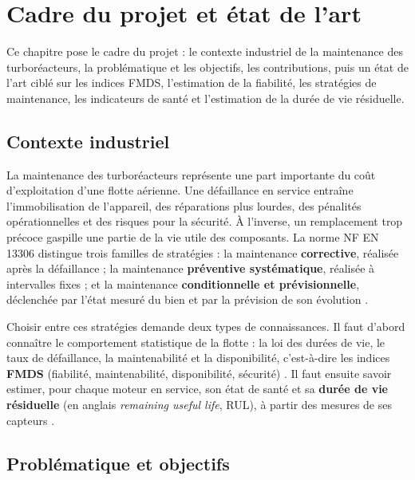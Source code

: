 \chapter{Cadre du projet et état de l'art}\label{sec:etat-art}

\chapintro

Ce chapitre pose le cadre du projet : le contexte industriel de la maintenance des turboréacteurs, la problématique et les objectifs, les contributions, puis un état de l'art ciblé sur les indices FMDS, l'estimation de la fiabilité, les stratégies de maintenance, les indicateurs de santé et l'estimation de la durée de vie résiduelle.

\section{Contexte industriel}\label{sec:contexte}

La maintenance des turboréacteurs représente une part importante du coût d'exploitation d'une flotte aérienne. Une défaillance en service entraîne l'immobilisation de l'appareil, des réparations plus lourdes, des pénalités opérationnelles et des risques pour la sécurité. À l'inverse, un remplacement trop précoce gaspille une partie de la vie utile des composants. La norme NF EN 13306 \cite{nf13306} distingue trois familles de stratégies : la maintenance \textbf{corrective}, réalisée après la défaillance ; la maintenance \textbf{préventive systématique}, réalisée à intervalles fixes ; et la maintenance \textbf{conditionnelle et prévisionnelle}, déclenchée par l'état mesuré du bien et par la prévision de son évolution \cite{jardine2006}.

Choisir entre ces stratégies demande deux types de connaissances. Il faut d'abord connaître le comportement statistique de la flotte : la loi des durées de vie, le taux de défaillance, la maintenabilité et la disponibilité, c'est-à-dire les indices \textbf{FMDS} (fiabilité, maintenabilité, disponibilité, sécurité) \cite{benhmida}. Il faut ensuite savoir estimer, pour chaque moteur en service, son état de santé et sa \textbf{durée de vie résiduelle} (en anglais \emph{remaining useful life}, RUL), à partir des mesures de ses capteurs \cite{lei2018,si2011}.

\section{Problématique et objectifs}\label{sec:objectifs}

